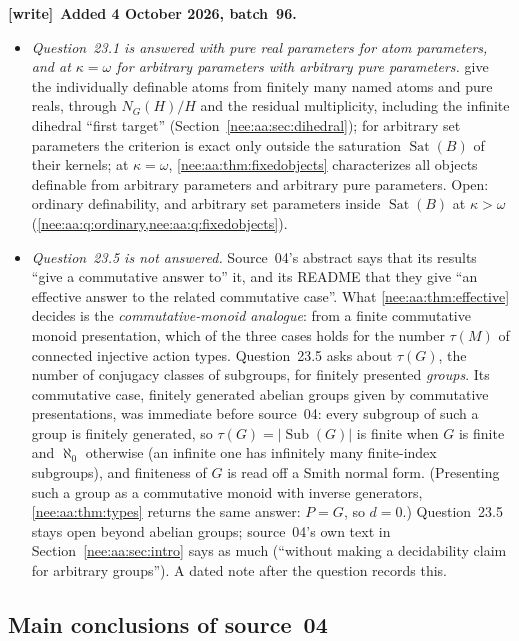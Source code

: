 \documentclass[11pt,letterpaper]{article}
\numberwithin{equation}{section}
\theoremstyle{plain}
\theoremstyle{definition}
\theoremstyle{remark}
\newcommand{\Sub}{\operatorname{Sub}}
\newcommand{\Sat}{\operatorname{Sat}}
\newenvironment{writenote}[1][]{\par\smallskip\begingroup\small\raggedright
 \setlength{\parindent}{1.25em}\noindent\textbf{[write]}\if\relax\detokenize{#1}\relax\else~\textbf{#1.}\fi\ }%
 {\par\endgroup\smallskip}
\begin{document}
\begin{writenote}[Added 4 October 2026, batch~96]
\begin{itemize}
\item \emph{Question~23.1 is answered with pure real parameters for atom parameters, and at $\kappa=\omega$ for arbitrary parameters with arbitrary pure parameters.}  give the individually definable atoms from finitely many named atoms and pure reals, through $N_G(H)/H$ and the residual multiplicity, including the infinite dihedral ``first target'' (Section~\ref{nee:aa:sec:dihedral}); for arbitrary set parameters the criterion is exact only outside the saturation $\Sat(B)$ of their kernels; at $\kappa=\omega$, \cref{nee:aa:thm:fixedobjects} characterizes all objects definable from arbitrary parameters and arbitrary pure parameters. Open: ordinary definability, and arbitrary set parameters inside $\Sat(B)$ at $\kappa>\omega$ (\cref{nee:aa:q:ordinary,nee:aa:q:fixedobjects}).
\item \emph{Question~23.5 is not answered.} Source~04's abstract says that its results ``give a commutative answer to'' it, and its README that they give ``an effective answer to the related commutative case''. What \cref{nee:aa:thm:effective} decides is the \emph{commutative-monoid analogue}: from a finite commutative monoid presentation, which of the three cases holds for the number $\tau(M)$ of connected injective action types. Question~23.5 asks about $\tau(G)$, the number of conjugacy classes of subgroups, for finitely presented \emph{groups}. Its commutative case, finitely generated abelian groups given by commutative presentations, was immediate before source~04: every subgroup of such a group is finitely generated, so $\tau(G)=|\Sub(G)|$ is finite when $G$ is finite and $\aleph_0$ otherwise (an infinite one has infinitely many finite-index subgroups), and finiteness of $G$ is read off a Smith normal form. (Presenting such a group as a commutative monoid with inverse generators, \cref{nee:aa:thm:types} returns the same answer: $P=G$, so $d=0$.) Question~23.5 stays open beyond abelian groups; source~04's own text in Section~\ref{nee:aa:sec:intro} says as much (``without making a decidability claim for arbitrary groups''). A dated note after the question records this.
\end{itemize}
\end{writenote}

\subsection{Main conclusions of source~04}
\end{document}
